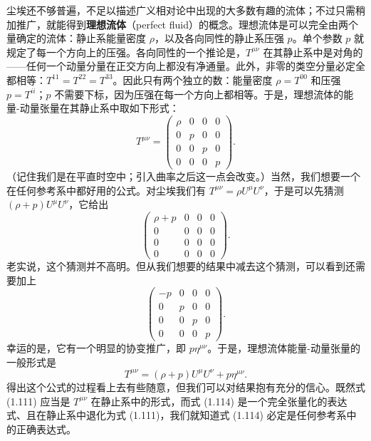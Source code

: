 尘埃还不够普遍，不足以描述广义相对论中出现的大多数有趣的流体；不过只需稍加推广，就能得到\textbf{理想流体}（perfect fluid）的概念。理想流体是可以完全由两个量确定的流体：静止系能量密度 $\rho$，以及各向同性的静止系压强 $p$。单个参数 $p$ 就规定了每一个方向上的压强。各向同性的一个推论是，$T^{\mu\nu}$ 在其静止系中是对角的——任何一个动量分量在正交方向上都没有净通量。此外，非零的类空分量必定全都相等：$T^{11}=T^{22}=T^{33}$。因此只有两个独立的数：能量密度 $\rho=T^{00}$ 和压强 $p=T^{ii}$；$p$ 不需要下标，因为压强在每一个方向上都相等。于是，理想流体的能量-动量张量在其静止系中取如下形式：
\begin{equation*}
T^{\mu\nu} =
\begin{pmatrix}
\rho & 0 & 0 & 0\\
0 & p & 0 & 0\\
0 & 0 & p & 0\\
0 & 0 & 0 & p
\end{pmatrix}.
\tag{1.111}
\end{equation*}
（记住我们是在平直时空中；引入曲率之后这一点会改变。）当然，我们想要一个在任何参考系中都好用的公式。对尘埃我们有 $T^{\mu\nu}=\rho U^{\mu}U^{\nu}$，于是可以先猜测 $(\rho+p)U^{\mu}U^{\nu}$，它给出
\begin{equation*}
\begin{pmatrix}
\rho+p & 0 & 0 & 0\\
0 & 0 & 0 & 0\\
0 & 0 & 0 & 0\\
0 & 0 & 0 & 0
\end{pmatrix}.
\tag{1.112}
\end{equation*}
老实说，这个猜测并不高明。但从我们想要的结果中减去这个猜测，可以看到还需要加上
\begin{equation*}
\begin{pmatrix}
-p & 0 & 0 & 0\\
0 & p & 0 & 0\\
0 & 0 & p & 0\\
0 & 0 & 0 & p
\end{pmatrix}.
\tag{1.113}
\end{equation*}
幸运的是，它有一个明显的协变推广，即 $p\eta^{\mu\nu}$。于是，理想流体能量-动量张量的一般形式是
\begin{equation*}
\boxed{T^{\mu\nu} = (\rho+p)U^{\mu}U^{\nu} + p\eta^{\mu\nu}.}
\tag{1.114}
\end{equation*}
得出这个公式的过程看上去有些随意，但我们可以对结果抱有充分的信心。既然式 (1.111) 应当是 $T^{\mu\nu}$ 在静止系中的形式，而式 (1.114) 是一个完全张量化的表达式、且在静止系中退化为式 (1.111)，我们就知道式 (1.114) 必定是任何参考系中的正确表达式。

